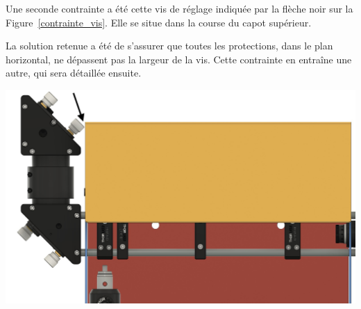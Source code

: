 \begin{minipage}[c]{0.4\textwidth}
    Une seconde contrainte a été cette vis de réglage indiquée par la flèche noir sur la Figure~\ref{contrainte_vis}. Elle se situe dans la course du capot supérieur.

    La solution retenue a été de s'assurer que toutes les protections, dans le plan horizontal, ne dépassent pas la largeur de la vis. Cette contrainte en entraîne une autre, qui sera détaillée ensuite.
\end{minipage}\hfill
\begin{minipage}[c]{0.58\textwidth}
    \begin{center}
        \includegraphics[width=\textwidth]{assets/figures/Protections_laser/Securite_mecanique/Protection_entree_laser/contrainte_vis.jpeg}
    \end{center}
    \label{contrainte_vis}
\end{minipage}

